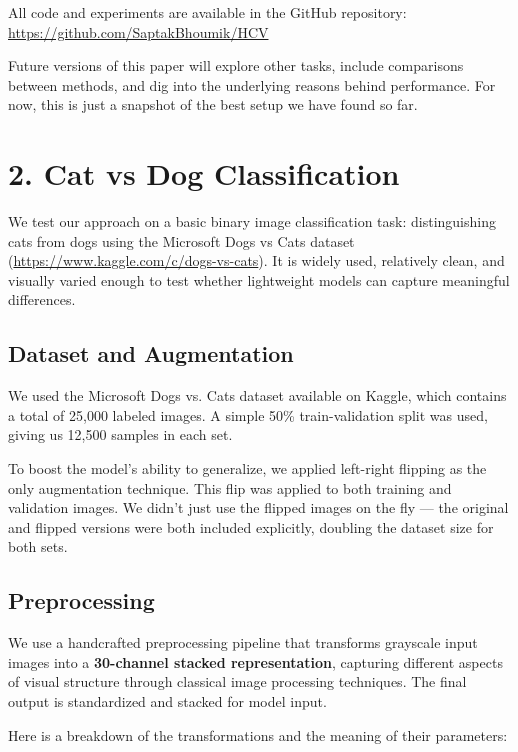 \documentclass{article}
\begin{document}
All code and experiments are available in the GitHub repository: \url{https://github.com/SaptakBhoumik/HCV}

Future versions of this paper will explore other tasks, include comparisons between methods, and dig into the underlying reasons behind performance. For now, this is just a snapshot of the best setup we have found so far.

\section*{2. Cat vs Dog Classification}

We test our approach on a basic binary image classification task: distinguishing cats from dogs using the Microsoft Dogs vs Cats dataset (\url{https://www.kaggle.com/c/dogs-vs-cats}). It is widely used, relatively clean, and visually varied enough to test whether lightweight models can capture meaningful differences.

\subsection*{Dataset and Augmentation}

We used the Microsoft Dogs vs. Cats dataset available on Kaggle, which contains a total of 25,000 labeled images. A simple 50\% train-validation split was used, giving us 12,500 samples in each set.

To boost the model's ability to generalize, we applied left-right flipping as the only augmentation technique. This flip was applied to both training and validation images. We didn’t just use the flipped images on the fly — the original and flipped versions were both included explicitly, doubling the dataset size for both sets.


\subsection*{Preprocessing}

We use a handcrafted preprocessing pipeline that transforms grayscale input images into a \textbf{30-channel stacked representation}, capturing different aspects of visual structure through classical image processing techniques. The final output is standardized and stacked for model input.

Here is a breakdown of the transformations and the meaning of their parameters:
\end{document}
